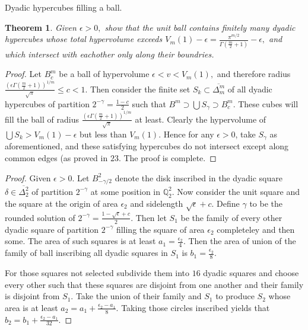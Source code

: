 \documentclass[letter]{article}
\newtheorem{theorem}{Theorem}
\newenvironment{menumerate}{%
  \edef\backupindent{\the\parindent}%
  \enumerate%
  \setlength{\parindent}{\backupindent}%
}{\endenumerate}
\begin{document}
\begin{menumerate}
\begin{menumerate}
				\item Dyadic hypercubes filling a ball.
				\begin{theorem}
				Given $\epsilon > 0,$ show that the unit ball contains finitely many dyadic hypercubes whose total hypervolume exceeds $V_m(1) -\epsilon = \frac{\pi^{m/2}}{\Gamma(\frac{m}{2}+1)} - \epsilon,$ and which intersect with eachother only along their boundries.
				\end{theorem}

				\begin{proof}
				     Let $B_c^m$ be a ball of hypervolume $\epsilon < v < V_m(1),$ and therefore radius $\frac{\left(\epsilon\Gamma(\frac{m}{2} + 1)\right)^{1/m}}{\sqrt{\pi}} \leq c < 1$. Then consider the finite set $S_k \subset \overline{\Delta_m^m}$ of all dyadic hypercubes of partition $2^{-\gamma} = \frac{1 - c}{2}$ such that $B^m \supset \bigcup S_\gamma \supset B_c^m$. These cubes will fill the ball of radius $\frac{\left(\epsilon\Gamma(\frac{m}{2} + 1)\right)^{1/m}}{\sqrt{\pi}}$ at least. Clearly the hypervolume of $\bigcup S_k > V_m(1) - \epsilon$ but less than $V_m(1).$ Hence for any $\epsilon > 0$, take $S_\gamma$ as aforementioned, and these satisfying hypercubes do not intersect except along common edges (as proved in $23$. The proof is complete.
				\end{proof}


				\item
				\begin{proof}
					Given $\epsilon > 0.$ Let $B^2_{-\gamma/2}$ denote the disk inscribed in the dyadic square $\delta \in \overline{\Delta_2^2}$ of partition $2^{-\gamma}$ at some position in $\mathbb{Q}_2^2.$ Now consider the unit square and the square at the origin of area $\epsilon_2$ and sidelength $\sqrt{\epsilon}+c.$ Define $\gamma$ to be the rounded solution of $2^{-\gamma} = \frac{1- \sqrt{\epsilon}+c}{2}.$ Then let $S_1$ be the family of every other dyadic square of partition $2^{-\gamma}$ filling the square of area $\epsilon_2$ completeley and then some. The area of such squares is at least $a_1 = \frac{\epsilon_2}{4}. $ Then the area of union of the family of ball inscribing all dyadic squares in $S_1$ is $b_1 = \frac{\epsilon_2}{8}.$ 

					For those squares not selected subdivide them into $16$ dyadic squares and choose every other such that these squares are disjoint from one another and their family is disjoint from $S_1.$ Take the union of their family and $S_1$ to produce $S_2$ whose area is at least $a_2 = a_1 + \frac{\epsilon_2-a_1}{8}.$ Taking those circles inscribed yields that $b_2 = b_1 + \frac{\epsilon_2-a_1}{32}.$


\end{proof}
\end{menumerate}
\end{menumerate}
\end{document}

